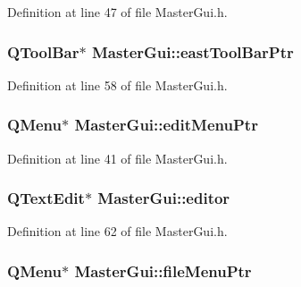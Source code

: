 Definition at line 47 of file Master\-Gui.\-h.

\hypertarget{class_master_gui_a289b4db70744b812566a689bf368c37c}{
\subsubsection[{east\-Tool\-Bar\-Ptr}]{\setlength{\rightskip}{0pt plus 5cm}Q\-Tool\-Bar$\ast$ Master\-Gui\-::east\-Tool\-Bar\-Ptr\hspace{0.3cm}{\ttfamily [private]}}}\label{class_master_gui_a289b4db70744b812566a689bf368c37c}


Definition at line 58 of file Master\-Gui.\-h.

\hypertarget{class_master_gui_aeb708f257518fb47d567d1130bfc7f7f}{
\subsubsection[{edit\-Menu\-Ptr}]{\setlength{\rightskip}{0pt plus 5cm}Q\-Menu$\ast$ Master\-Gui\-::edit\-Menu\-Ptr\hspace{0.3cm}{\ttfamily [private]}}}\label{class_master_gui_aeb708f257518fb47d567d1130bfc7f7f}


Definition at line 41 of file Master\-Gui.\-h.

\hypertarget{class_master_gui_a0681f0b3d1828d84c0c0cd7e4d765d98}{
\subsubsection[{editor}]{\setlength{\rightskip}{0pt plus 5cm}Q\-Text\-Edit$\ast$ Master\-Gui\-::editor\hspace{0.3cm}{\ttfamily [private]}}}\label{class_master_gui_a0681f0b3d1828d84c0c0cd7e4d765d98}


Definition at line 62 of file Master\-Gui.\-h.

\hypertarget{class_master_gui_a1d768ad74ddb657928df8539c356abb6}{
\subsubsection[{file\-Menu\-Ptr}]{\setlength{\rightskip}{0pt plus 5cm}Q\-Menu$\ast$ Master\-Gui\-::file\-Menu\-Ptr\hspace{0.3cm}{\ttfamily [private]}}}\label{class_master_gui_a1d768ad74ddb657928df8539c356abb6}


